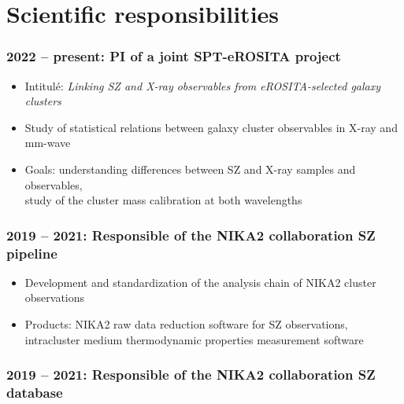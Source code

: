 \section{Scientific responsibilities}

\subsubsection{2022 -- present: PI of a joint SPT-eROSITA project}

\begin{itemize}
    \setlength{\itemsep}{0pt}
    \item Intitulé: \textit{Linking SZ and X-ray observables from eROSITA-selected galaxy clusters}
    \item Study of statistical relations between galaxy cluster observables in X-ray and mm-wave
    \item Goals: understanding differences between SZ and X-ray samples and observables, \\
          study of the cluster mass calibration at both wavelengths
\end{itemize} 

\subsubsection{2019 -- 2021: Responsible of the NIKA2 collaboration SZ pipeline}

\begin{itemize}
    \setlength{\itemsep}{0pt}
    \item Development and standardization of the analysis chain of NIKA2 cluster observations
    \item Products: NIKA2 raw data reduction software for SZ observations, \\ intracluster medium thermodynamic properties measurement software
\end{itemize} 
\subsubsection{2019 -- 2021: Responsible of the NIKA2 collaboration SZ database}
